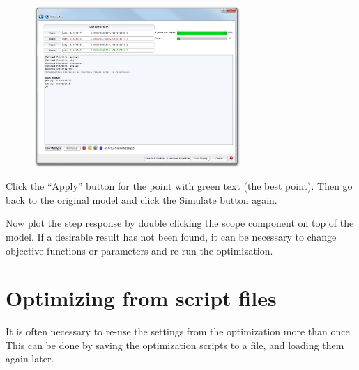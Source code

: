 \documentclass[a4paper]{article}
\begin{document}
\begin{enumerate}
\FloatBarrier
\begin{figure}[h]
\center
\includegraphics[width=0.7\textwidth]{gfx/optimization/screenshot-opt5c.png}
\end{figure}
\FloatBarrier

Click the ``Apply'' button for the point with green text (the best point). Then go back to the original model and click the Simulate button again.


Now plot the step response by double clicking the scope component on top of the model. If a desirable result has not been found, it can be necessary to change objective functions or parameters and re-run the optimization.

\end{enumerate}

\section*{Optimizing from script files}
It is often necessary to re-use the settings from the optimization more than once. This can be done by saving the optimization scripts to a file, and loading them again later.
\end{document}
